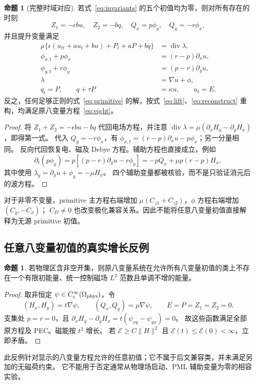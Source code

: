 \documentclass[UTF8,a4paper,11pt,fontset=none]{ctexart}
\numberwithin{equation}{section}
\theoremstyle{definition}
\newtheorem{proposition}[theorem]{命题}
\theoremstyle{definition}
\newcommand{\Om}{\Omega}
\newcommand{\eps}{\epsilon}
\newcommand{\Ecal}{\mathcal E}
\DeclareMathOperator{\diver}{div}
\begin{document}
\begin{proposition}[完整时域对应]\label{prop:mapping}
若式~\eqref{eq:invariants} 的五个初值均为零，则对所有存在的时刻
\begin{equation}\label{eq:reconstruct}
 \boxed{Z_1=-\eps bu,\quad Z_2=-bq,\quad Q_x=p\phi_y,\quad Q_y=-r\phi_x,}
\end{equation}
并且提升变量满足
\begin{equation}\label{eq:primitive}
\begin{aligned}
 \mu\{\eps(u_{tt}+au_t+bu)+P_t+aP+bq\}&=\diver\lambda,\\
 \phi_{x,t}+p\phi_x&=(r-p)\partial_xu,\\
 \phi_{y,t}+r\phi_y&=(p-r)\partial_yu,\\
 \lambda&=\nabla u+\phi,\\
 q_t=P,\qquad q+\tau P&=\kappa u,\qquad u_t=E.
\end{aligned}
\end{equation}
反之，任何足够正则的式~\eqref{eq:primitive} 的解，按式~\eqref{eq:lift}、\eqref{eq:reconstruct} 重构，均满足原八变量方程~\eqref{eq:eight}。
\end{proposition}
\begin{proof}
将 $Z_1+Z_2=-\eps bu-bq$ 代回电场方程，并注意
$\diver\lambda=\mu(\partial_xH_y-\partial_yH_x)$，即得第一式。
代入 $Q_y=-r\phi_x$，有
$\phi_{x,t}=(r-p)\partial_xu-p\phi_x$；另一分量相同。
反向代回恢复电、磁及 Debye 方程。辅助方程也直接成立，例如
\[
 \partial_t(p\phi_y)
 =p[(p-r)\partial_yu-r\phi_y]
 =-pQ_x+\mu p(r-p)H_x,
\]
其中使用 $\lambda_y=\partial_yu+\phi_y=-\mu H_x$。
四个辅助变量都被核验，而不是只验证消元后的波方程。
\end{proof}

对于非零不变量，primitive 主方程右端增加
$\mu(C_{z1}+C_{z2})$，$\phi$ 方程右端增加 $(C_y,-C_x)$；
$C_D\ne0$ 也改变极化兼容关系。因此不能将任意八变量初值直接解释为无源 primitive 初值。

\subsection{任意八变量初值的真实增长反例}
\begin{proposition}\label{prop:growth}
若物理区含非空开集，则原八变量系统在允许所有八变量初值的类上不存在一个有限初能量、统一控制磁场 $L^2$ 范数且单调不增的能量。
\end{proposition}
\begin{proof}
取非恒定 $\psi\in C_c^\infty(\Om_{\rm phys})$，令
\[
 (H_x,H_y)=t\nabla\psi,\qquad (Q_x,Q_y)=\mu\nabla\psi,
 \qquad E=P=Z_1=Z_2=0.
\]
支集处 $p=r=0$，且
$\partial_xH_y-\partial_yH_x=t(\psi_{xy}-\psi_{yx})=0$。
故这些函数满足全部原方程及 PEC。磁能按 $t^2$ 增长。
若 $\Ecal\ge C\|H\|^2$ 且 $\Ecal(t)\le\Ecal(0)<\infty$，立即矛盾。
\end{proof}
此反例针对显示的八变量方程允许的任意初值；它不属于后文兼容类，并未满足另加的无磁荷约束。
它不能用于否定通常从物理场启动、PML 辅助变量为零的相容实验。
\end{document}
